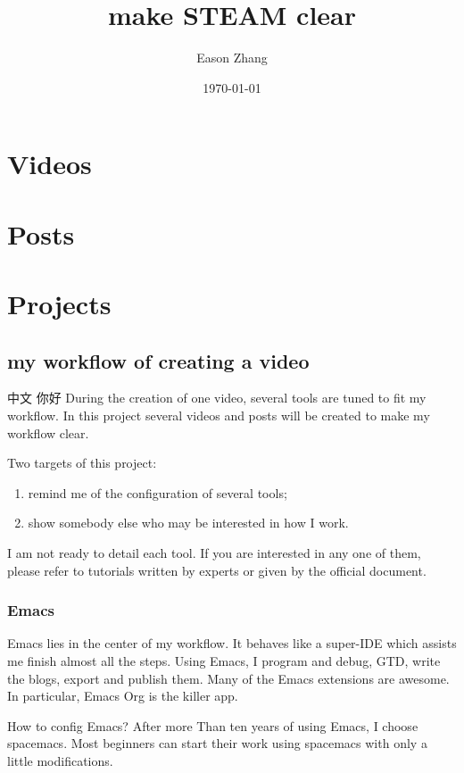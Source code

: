 \documentclass[koma,letterpaper,captions=tableheading,ctex,11pt,listings-sv,microtype,paralist,colorlinks=true,urlcolor=blue]{org-article}
\author{Eason Zhang}
\date{\today}
\title{make STEAM clear}
\begin{document}
\maketitle
\tableofcontents


\section{Videos}
\label{sec:orgc58e4f7}



\section{Posts}
\label{sec:orgb1332b6}


\section{Projects}
\label{sec:orgffac4f6}


\subsection{my workflow of creating a video}
\label{sec:orgb86eaa9}
 中文 你好
During the creation of one video, several tools are tuned to fit my workflow. In
this project several videos and posts will be created to make my workflow clear.

Two targets of this project:
\begin{enumerate}
\item remind me of the configuration of several tools;
\item show somebody else who may be interested in how I work.
\end{enumerate}

I am not ready to detail each tool. If you are interested in any one of them,
please refer to tutorials written by experts or given by the official document.

\subsubsection{Emacs}
\label{sec:orgadf0dac}


Emacs lies in the center of my workflow. It behaves like a super-IDE which
assists me finish almost all the steps. Using Emacs, I program and debug, GTD,
write the blogs, export and publish them. Many of the Emacs extensions are
awesome. In particular, Emacs Org is the killer app.

How to config Emacs? After more Than ten years of using Emacs, I choose
spacemacs. Most beginners can start their work using spacemacs with only a
little modifications.
\end{document}
